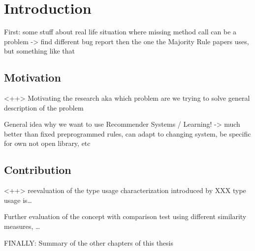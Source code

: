 \chapter{Introduction}\label{chapter:introduction}

First: some stuff about real life situation where missing method call can be a problem
-> find different bug report then the one the Majority Rule papers uses, but something like that
  
\section{Motivation}<++>
Motivating the research aka which problem are we trying to solve
general description of the problem

General idea why we want to use Recommender Systems / Learning!
-> much better than fixed preprogrammed rules, can adapt to changing system, be specific for own not open library, etc

\section{Contribution}<++>
reevaluation of the type usage characterization introduced by XXX
type usage is\ldots

Further evaluation of the concept with comparison test using different similarity measures, \ldots

FINALLY: Summary of the other chapters of this thesis
